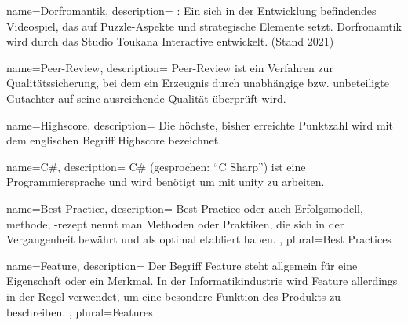 {
	name=Dorfromantik,
	description={
		\cite{DorfromantikHomepage}: Ein sich in der Entwicklung befindendes Videospiel, das auf Puzzle-Aspekte und strategische Elemente setzt. Dorfronamtik wird durch das Studio Toukana Interactive entwickelt. (Stand 2021)
	}
}

{
	name=Peer-Review,
	description={
		Peer-Review ist ein Verfahren zur Qualitätssicherung, bei dem ein Erzeugnis durch unabhängige bzw. unbeteiligte Gutachter auf seine ausreichende Qualität überprüft wird.
	}
}

{
	name=Highscore,
	description={
		Die höchste, bisher erreichte Punktzahl wird mit dem englischen Begriff Highscore bezeichnet.
	}
}

{
	name=C\#,
	description={
		C\# (gesprochen: \enquote{C Sharp}) ist eine Programmiersprache und wird benötigt um mit \gls{unity} zu arbeiten.
	}
}

{
	name=Best Practice,
	description={
		Best Practice oder auch Erfolgsmodell, -methode, -rezept nennt man Methoden oder Praktiken, die sich in der Vergangenheit bewährt und als optimal etabliert haben.
	},
	plural={Best Practices}
}

{
	name=Feature,
	description={
		Der Begriff Feature steht allgemein für eine Eigenschaft oder ein Merkmal. In der Informatikindustrie wird Feature allerdings in der Regel verwendet, um eine besondere Funktion des Produkts zu beschreiben.
	},
	plural={Features}
}

